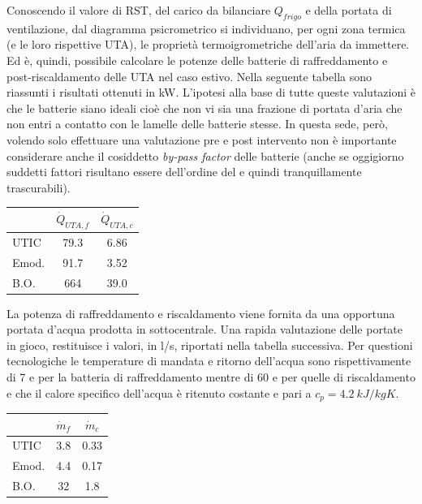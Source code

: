 Conoscendo il valore di RST, del carico da bilanciare $Q_{frigo}$ e della portata di ventilazione, dal diagramma psicrometrico si individuano, per ogni zona termica (e le loro rispettive UTA), le proprietà termoigrometriche dell'aria da immettere. Ed è, quindi, possibile calcolare le potenze delle batterie di raffreddamento e post-riscaldamento delle UTA nel caso estivo. Nella seguente tabella sono riassunti i risultati ottenuti in \si{kW}. L'ipotesi alla base di tutte queste valutazioni è che le batterie siano ideali cioè che non vi sia una frazione di portata d'aria che non entri a contatto con le lamelle delle batterie stesse. In questa sede, però, volendo solo effettuare una valutazione pre e post intervento non è importante considerare anche il cosiddetto \emph{by-pass factor} delle batterie (anche se oggigiorno suddetti fattori risultano essere dell'ordine del  e quindi tranquillamente trascurabili).
\begin{center}
	\begin{tabular}{lcc}
		&	$\dot{Q}_{UTA,f}$		&	$\dot{Q}_{UTA,c}$\\
		\midrule
		UTIC	&	\num{79.3}			&	\num{6.86}\\
		Emod.	&	\num{91.7}			&	\num{3.52}\\
		B.O.	&	\num{664}			&	\num{39.0}\\
	\end{tabular}
\end{center}
La potenza di raffreddamento e riscaldamento viene fornita da una opportuna portata d'acqua prodotta in sottocentrale. Una rapida valutazione delle portate in gioco, restituisce i valori, in \si{l/s}, riportati nella tabella successiva. Per questioni tecnologiche le temperature di mandata e ritorno dell'acqua sono rispettivamente di \num{7} e  per la batteria di raffreddamento mentre di \num{60} e  per quelle di riscaldamento e che il calore specifico dell'acqua è ritenuto costante e pari a $c_p=\SI{4.2}{kJ/kgK}$.
\begin{center}
	\begin{tabular}{lcc}
			&	$\dot{m}_f$	&	$\dot{m}_c$\\
			\midrule
			UTIC	&	\num{3.8}	&	\num{0.33}\\
			Emod.	&	\num{4.4}	&	\num{0.17}\\
			B.O.	&	\num{32}		&	\num{1.8}\\
	\end{tabular}
\end{center}

